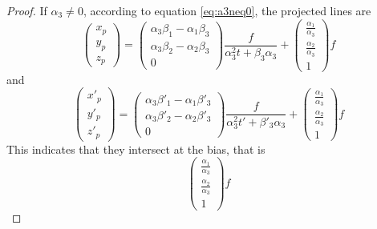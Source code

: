 \documentclass[a4paper,11pt]{article}
\begin{document}
\begin{proof}
If $\alpha_3 \neq 0$, according to equation \ref{eq:a3neq0}, the projected lines are
\[
  \begin{pmatrix} x_p \\ y_p \\ z_p \end{pmatrix} 
   = \begin{pmatrix} \alpha_3\beta_1- \alpha_1\beta_3 \\
   \alpha_3\beta_2- \alpha_2\beta_3 \\
   0 \end{pmatrix} \frac{f}{\alpha_3^2 t + \beta_3\alpha_3}
   + \begin{pmatrix} \frac{\alpha_1}{\alpha_3} \\ \frac{\alpha_2}{\alpha_3} \\ 1 \end{pmatrix} f 
\]
and
\[
  \begin{pmatrix} x'_p \\ y'_p \\ z'_p \end{pmatrix} 
   = \begin{pmatrix} \alpha_3\beta'_1- \alpha_1\beta'_3 \\
   \alpha_3\beta'_2- \alpha_2\beta'_3 \\
   0 \end{pmatrix} \frac{f}{\alpha_3^2 t' + \beta'_3\alpha_3}
   + \begin{pmatrix} \frac{\alpha_1}{\alpha_3} \\ \frac{\alpha_2}{\alpha_3} \\ 1 \end{pmatrix} f 
\]
This indicates that they intersect at the bias, that is
\[ \begin{pmatrix} \frac{\alpha_1}{\alpha_3} \\ \frac{\alpha_2}{\alpha_3} \\ 1 \end{pmatrix} f \]


\end{proof}
\end{document}
